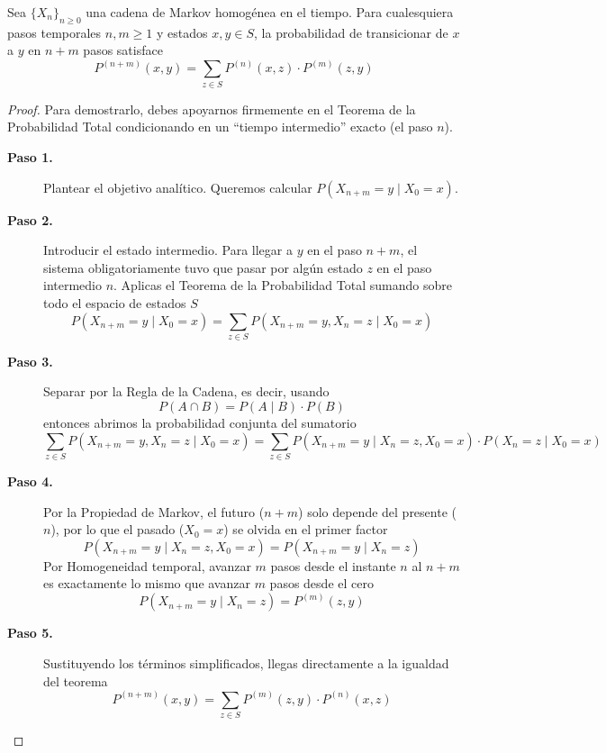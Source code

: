 \documentclass[10pt]{book}
\newcommand{\tbf}{\textbf}
\begin{document}
\begin{teo}
    Sea $\{X_n\}_{n \ge 0}$ una cadena de Markov homogénea en el tiempo. Para cualesquiera pasos temporales $n, m \ge 1$ y estados $x, y \in S$, la probabilidad de transicionar de $x$ a $y$ en $n+m$ pasos satisface
    $$P^{(n+m)}(x, y) = \sum_{z \in S} P^{(n)}(x, z) \cdot P^{(m)}(z, y)$$
\begin{proof}
    Para demostrarlo, debes apoyarnos firmemente en el Teorema de la Probabilidad Total condicionando en un ``tiempo intermedio'' exacto (el paso $n$).
    \begin{description}
        \item[\tbf{Paso 1.}] Plantear el objetivo analítico. Queremos calcular $P(X_{n+m} = y \mid X_0 = x)$.
        \item[\tbf{Paso 2.}] Introducir el estado intermedio. Para llegar a $y$ en el paso $n+m$, el sistema obligatoriamente tuvo que pasar por algún estado $z$ en el paso intermedio $n$. Aplicas el Teorema de la Probabilidad Total sumando sobre todo el espacio de estados $S$
        $$P(X_{n+m} = y \mid X_0 = x) = \sum_{z \in S} P(X_{n+m} = y, X_n = z \mid X_0 = x)$$
        \item[\tbf{Paso 3.}] Separar por la Regla de la Cadena, es decir, usando
        \begin{equation*}
            P(A\cap B) = P(A \mid B) \cdot P(B )
        \end{equation*}
        entonces abrimos la probabilidad conjunta del sumatorio
        $$\sum_{z \in S} P(X_{n+m} = y, X_n = z \mid X_0 = x)= \sum_{z \in S} P(X_{n+m} = y \mid X_n = z, X_0 = x) \cdot P(X_n = z \mid X_0 = x)$$
        \item[\tbf{Paso 4.}] Por la Propiedad de Markov, el futuro ($n+m$) solo depende del presente ($n$), por lo que el pasado ($X_0 = x$) se olvida en el primer factor
        $$P(X_{n+m} = y \mid X_n = z, X_0 = x) = P(X_{n+m} = y \mid X_n = z)$$
        Por Homogeneidad temporal, avanzar $m$ pasos desde el instante $n$ al $n+m$ es exactamente lo mismo que avanzar $m$ pasos desde el cero
        $$P(X_{n+m} = y \mid X_n = z) = P^{(m)}(z, y)$$
        \item[\tbf{Paso 5.}] Sustituyendo los términos simplificados, llegas directamente a la igualdad del teorema
        $$P^{(n+m)}(x, y) = \sum_{z \in S} P^{(m)}(z, y) \cdot P^{(n)}(x, z)$$
    \end{description}
\end{proof}
\end{teo}
\end{document}
